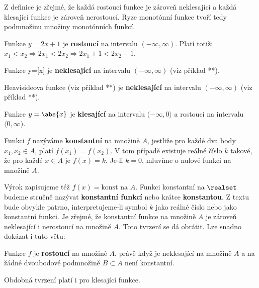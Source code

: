         Z definice je zřejmé, že každá rostoucí funkce je zároveň neklesající a každá klesající 
        funkce je zároveň nerostoucí. Ryze monotónní funkce tvoří tedy podmnožinu množiny 
        monotónních funkcí. 
           
        \begin{example}
          Funkce $y=2x+1$ je \textbf{rostoucí} na intervalu $(-\infty, \infty)$. Platí totiž:
          $x_1<x_2\Rightarrow 2x_1<2x_2\Rightarrow2x_1+1<2x_2+1$.
        \end{example}
        \begin{example}
          Funkce y=[x] je \textbf{neklesající} na intervalu $(-\infty, \infty)$ (viz příklad **). 
        \end{example}
        \begin{example}
          Heavisideova funkce (viz příklad **) je \textbf{neklesající} na intervalu $(-\infty,
          \infty)$ (viz příklad **). 
        \end{example}       
        \begin{example}
          Funkce $y=\abs{x}$ je \textbf{klesající} na intervalu $(-\infty, 0\rangle$ a rostoucí na
          intervalu $\langle0, \infty)$. 
        \end{example}  
            
        \begin{definition}\label{MA1:def_lim03}
          Funkci $f$ nazýváme \textbf{konstantní} na množině $A$, jestliže pro každé dva body $x_1, 
          x_2\in A$, platí $f(x_1)=f(x_2)$. V tom případě existuje reálné číslo $k$ takové, že pro 
          každé $x\in A$ je $f(x)=k$. Je-li $k=0$, mluvíme o nulové funkci na množině $A$. 
        \end{definition} 
          
        Výrok  zapisujeme též $f(x)=\text{konst na }A$. 
        Funkci konstantní na \(\realset\) budeme stručně nazývat \textbf{konstantní funkcí} nebo 
        krátce \textbf{konstantou}. Z textu bude obvykle patrno, interpretujeme-li symbol $k$ jako 
        reálné číslo nebo jako konstantní funkci. Je zřejmé, že konstantní funkce na množině $A$ je 
        zároveň neklesající i nerostoucí na množině $A$. Toto tvrzení se dá obrátit. Lze snadno 
        dokázat i tuto větu:        
        \begin{lemma}\label{MA1:lem_lim01}
          Funkce $f$ je \textbf{rostoucí} na množině $A$, právě když je neklesající na množině $A$ a na žádné dvoubodové podmnožině $B\subset A$ není konstantní. 
        \end{lemma}
        Obdobná tvrzení platí i pro klesající funkce. 
               
